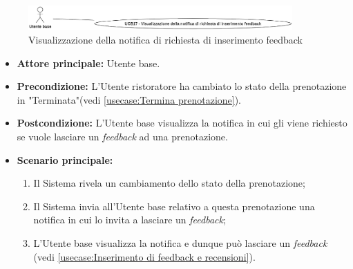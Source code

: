 \label{usecase:Visualizzazione della notifica di richiesta di inserimento feedback}

\begin{figure}[h]
	\centering
	\includegraphics[width=0.9\textwidth]{./uml/UCB17.png} 
	\caption{Visualizzazione della notifica di richiesta di inserimento feedback}
	\label{fig:UCB17}
  \end{figure}

\begin{itemize}
	\item \textbf{Attore principale:} Utente base.


	\item \textbf{Precondizione:} L'Utente ristoratore ha cambiato lo stato della prenotazione in "Terminata"(vedi \autoref{usecase:Termina prenotazione}).


	\item \textbf{Postcondizione:} L'Utente base visualizza la notifica in cui
	      gli viene richiesto se vuole lasciare un \textit{feedback} ad una prenotazione.

	\item \textbf{Scenario principale:}
	      \begin{enumerate}
		      \item Il Sistema rivela un cambiamento dello stato della prenotazione;
		      \item Il Sistema invia all'Utente base relativo a questa prenotazione una notifica in cui lo invita a lasciare un \textit{feedback};
		      \item L'Utente base visualizza la notifica e dunque può lasciare un \textit{feedback} (vedi \autoref{usecase:Inserimento di feedback e recensioni}).
	      \end{enumerate}
\end{itemize}
